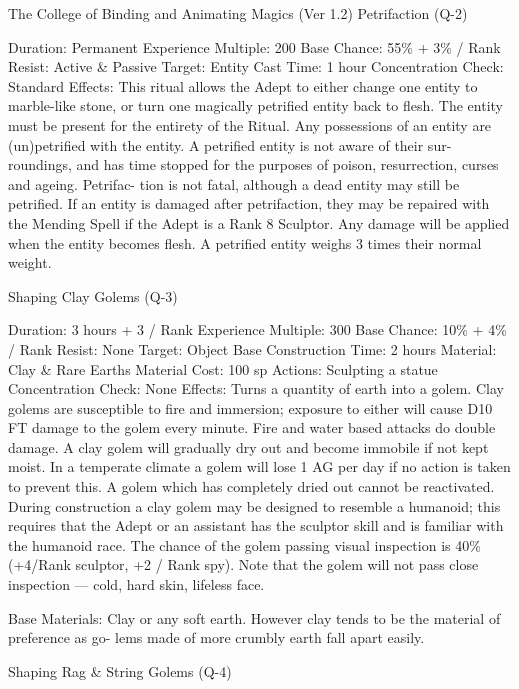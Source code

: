 \begin{Chapter}{The College of Binding and Animating Magics (Ver 1.2)}
Petrifaction (Q-2) 

Duration: Permanent 
Experience Multiple: 200 
Base Chance: 55\% + 3\% / Rank 
Resist: Active \& Passive 
Target: Entity 
Cast Time: 1 hour 
Concentration Check: Standard 
Effects:  This  ritual  allows  the  Adept  to  either 
change one entity to marble-like stone, or turn one 
magically  petrified  entity  back to  flesh.  The  entity 
must be present for the entirety of the Ritual. Any 
possessions  of  an  entity  are  (un)petrified  with  the 
entity.  A  petrified  entity  is  not  aware  of  their  sur-
roundings,  and  has  time  stopped  for  the  purposes 
of poison, resurrection, curses and ageing. Petrifac-
tion is not fatal, although a dead entity may still be 
petrified. If an entity is damaged after petrifaction, 
they may be repaired with the Mending Spell if the 
Adept  is  a  Rank  8  Sculptor.  Any  damage  will  be 
applied when the entity becomes flesh. A petrified 
entity weighs 3 times their normal weight. 


Shaping Clay Golems (Q-3) 


Duration: 3 hours + 3 / Rank 
Experience Multiple: 300 
Base Chance: 10\% + 4\% / Rank 
Resist: None 
Target: Object 
Base Construction Time: 2 hours 
Material:  Clay  \&  Rare  Earths  Material  Cost:  100 
sp 
Actions: Sculpting a statue 
Concentration Check: None 
Effects:  Turns  a  quantity  of  earth  into  a  golem. 
Clay golems are susceptible to fire and immersion; 
exposure  to  either  will  cause  D10  FT  damage  to 
the  golem  every  minute.  Fire  and  water  based 
attacks  do  double  damage.  A  clay  golem  will 
gradually dry out and become immobile if not kept 
moist.  In  a  temperate  climate  a  golem  will  lose  1 
AG per day if no action is taken to prevent this. A 
golem  which  has  completely  dried  out  cannot  be 
reactivated. During construction a clay golem may 
be  designed to  resemble  a  humanoid;  this  requires 
that the Adept or an assistant has the sculptor skill 
and is familiar with the humanoid race. The chance 
of  the  golem  passing  visual  inspection  is  40\% 
(+4/Rank  sculptor,  +2  /  Rank  spy).  Note  that  the 
golem will  not pass  close  inspection —  cold, hard 
skin, lifeless face. 

Base  Materials:  Clay  or  any  soft  earth.  However 
clay  tends  to  be  the  material  of  preference  as  go-
lems made of more crumbly earth fall apart easily. 

Shaping Rag \& String Golems (Q-4) 


\end{Chapter}
